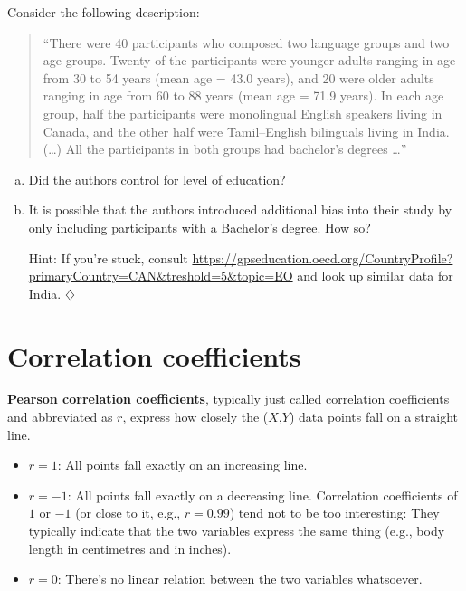 \documentclass[a4paper]{tufte-book}\usepackage[]{graphicx}\usepackage[]{xcolor}
\newcommand{\term}[1]{\textbf{#1}}
\newcommand*{\parend}[1][$\diamondsuit$]{%
  \unskip\nobreak\hspace{1em plus 1fill}$\diamondsuit$%
}
\begin{document}
Consider the following description:

\begin{quote}
``There were 40 participants who composed two language groups and two age groups.
Twenty of the participants were younger adults ranging in age from 30 to 54
years (mean age = 43.0 years), and 20 were older adults ranging in age from
60 to 88 years (mean age = 71.9 years). In each age group, half the participants
were monolingual English speakers living in Canada, and the other half were
Tamil--English bilinguals living in India. (\dots) All the participants in
both groups had bachelor's degrees \dots'' \citep[p.~44]{Bialystok2004}
\end{quote}

\begin{enumerate}[(a)]
  \item Did the authors control for level of education?
  \item It is possible that the authors introduced additional bias into their
        study by only including participants with a Bachelor's degree.
        How so?
        
        Hint: If you're stuck, consult 
        \url{https://gpseducation.oecd.org/CountryProfile?primaryCountry=CAN&treshold=5&topic=EO} 
        and look up similar data for India. \parend
\end{enumerate}

\section{Correlation coefficients}
\term{Pearson correlation coefficients}, typically just called
correlation coefficients and abbreviated as $r$,
express how closely the ($X$,$Y$) data points fall on a straight line.

\begin{itemize}
 \item $r = 1$: All points fall exactly on an increasing line.
 \item $r = -1$: All points fall exactly on a decreasing line.
 Correlation coefficients of $1$ or $-1$ (or close to it, e.g., $r = 0.99$)
 tend not to be too interesting: They typically indicate that the two variables
 express the same thing (e.g., body length in centimetres and in inches).
 \item $r = 0$: There's no linear relation between the two variables whatsoever.
\end{itemize}
\end{document}
